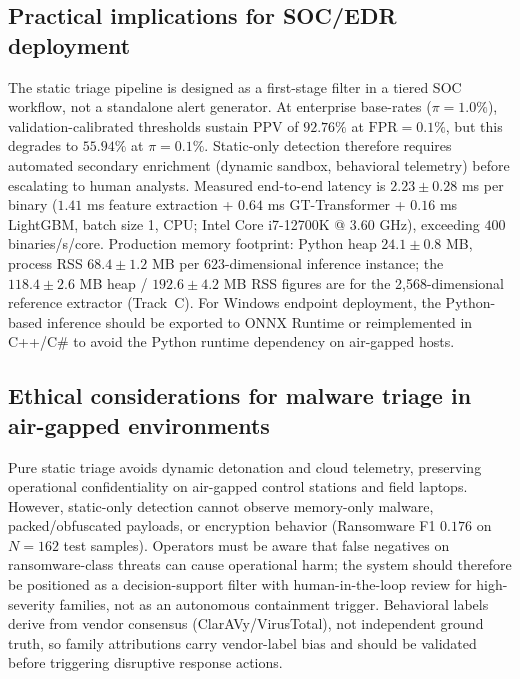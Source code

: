 \documentclass[Number]{sn-jnl}
\begin{document}
\subsection*{Practical implications for SOC/EDR deployment}
The static triage pipeline is designed as a first-stage filter in a tiered SOC workflow, not a standalone alert generator. At enterprise base-rates ($\pi = 1.0\%$), validation-calibrated thresholds sustain PPV of $92.76\%$ at $\mathrm{FPR}=0.1\%$, but this degrades to $55.94\%$ at $\pi=0.1\%$. Static-only detection therefore requires automated secondary enrichment (dynamic sandbox, behavioral telemetry) before escalating to human analysts. Measured end-to-end latency is $2.23\pm0.28$ ms per binary ($1.41$ ms feature extraction + $0.64$ ms GT-Transformer + $0.16$ ms LightGBM, batch size 1, CPU; Intel Core i7-12700K @ 3.60 GHz), exceeding $400$ binaries/s/core. Production memory footprint: Python heap $24.1\pm0.8$ MB, process RSS $68.4\pm1.2$ MB per 623-dimensional inference instance; the $118.4\pm2.6$ MB heap / $192.6\pm4.2$ MB RSS figures are for the 2,568-dimensional reference extractor (Track~C). For Windows endpoint deployment, the Python-based inference should be exported to ONNX Runtime or reimplemented in C++/C\# to avoid the Python runtime dependency on air-gapped hosts.

\subsection*{Ethical considerations for malware triage in air-gapped environments}
Pure static triage avoids dynamic detonation and cloud telemetry, preserving operational confidentiality on air-gapped control stations and field laptops. However, static-only detection cannot observe memory-only malware, packed/obfuscated payloads, or encryption behavior (Ransomware F1 $0.176$ on $N=162$ test samples). Operators must be aware that false negatives on ransomware-class threats can cause operational harm; the system should therefore be positioned as a decision-support filter with human-in-the-loop review for high-severity families, not as an autonomous containment trigger. Behavioral labels derive from vendor consensus (ClarAVy/VirusTotal), not independent ground truth, so family attributions carry vendor-label bias and should be validated before triggering disruptive response actions.
\end{document}

